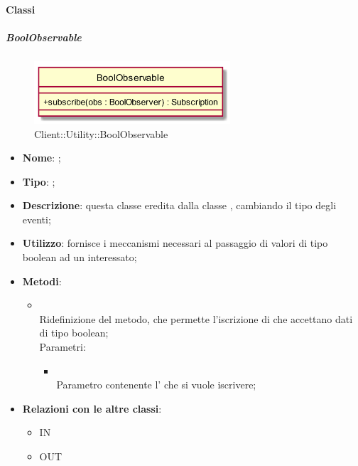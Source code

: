 \paragraph{Classi}
\hypertarget{BoolObservable_label}{\subparagraph{BoolObservable}}
\begin{figure}[h]
	\centering
	\includegraphics[width=0.65\textwidth,height=\textheight,keepaspectratio]{images/ClassBoolObservable.png}
	\caption{Client::Utility::BoolObservable}
\end{figure}
\begin{itemize}
	\item \textbf{Nome}: ;
	\item \textbf{Tipo}: ;
	\item \textbf{Descrizione}: questa classe eredita dalla classe , cambiando il tipo degli eventi;
	\item \textbf{Utilizzo}: fornisce i meccanismi necessari al passaggio di valori di tipo boolean ad un  interessato;
	\item \textbf{Metodi}:
	\begin{itemize}
		\item[]  \\		Ridefinizione del metodo, che permette l'iscrizione di  che accettano dati di tipo boolean;\\
		Parametri:
		\begin{itemize}
			\item {} \\
			Parametro contenente l' che si vuole iscrivere;
		\end{itemize}
	\end{itemize}
	\item \textbf{Relazioni con le altre classi}:
	\begin{itemize}
		\item IN \hyperlink{Player_label}{}
		\item OUT \hyperlink{BoolObserver_label}{}
	\end{itemize}
\end{itemize}
\FloatBarrier

